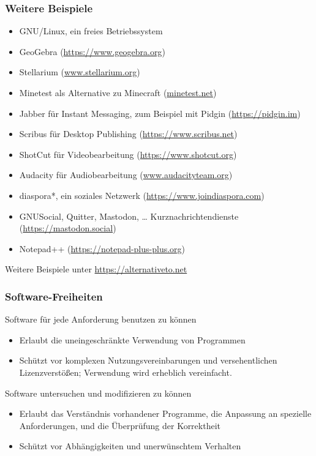 \documentclass{beamer}
\begin{document}
\begin{frame}
  \frametitle{Weitere Beispiele}

  \onslide<+->

  \begin{itemize}
  \item GNU/Linux, ein freies Betriebssystem %
  \item GeoGebra (\url{https://www.geogebra.org})
  \item Stellarium (\url{www.stellarium.org})
  \item Minetest als Alternative zu Minecraft (\url{minetest.net})
  \item Jabber für Instant Messaging, zum Beispiel mit Pidgin
    (\url{https://pidgin.im})
  \item Scribus für Desktop Publishing (\url{https://www.scribus.net})
  \item ShotCut für Videobearbeitung (\url{https://www.shotcut.org})
  \item Audacity für Audiobearbeitung (\url{www.audacityteam.org})
  \item diaspora*, ein soziales Netzwerk (\url{https://www.joindiaspora.com})
  \item GNUSocial, Quitter, Mastodon, \dots{} Kurznachrichtendienste
    (\url{https://mastodon.social})
  \item Notepad++ (\url{https://notepad-plus-plus.org})
  \end{itemize}

  Weitere Beispiele unter \url{https://alternativeto.net}

\end{frame}

\begin{frame}
  \frametitle{Software-Freiheiten}

  \onslide<+->
  \onslide<+->

  \begin{block}{Software für jede Anforderung benutzen zu können}
    \begin{itemize}
    \item Erlaubt die uneingeschränkte Verwendung von Programmen
    \item Schützt vor komplexen Nutzungsvereinbarungen und versehentlichen
      Lizenzverstößen; Verwendung wird erheblich vereinfacht.
    \end{itemize}
  \end{block}

  \onslide<+->

  \begin{block}{Software untersuchen und modifizieren zu können}
    \begin{itemize}
    \item Erlaubt das Verständnis vorhandener Programme, die Anpassung an
      spezielle Anforderungen, und die Überprüfung der Korrektheit
    \item Schützt vor Abhängigkeiten und unerwünschtem Verhalten
    \end{itemize}
  \end{block}

\end{frame}
\end{document}
